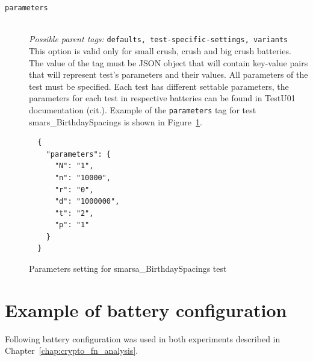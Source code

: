 \documentclass[
  digital,  	%
  color,		%
  oneside,   	%
  12pt,
  nocover,
  notable,
  nolof,
  nolot,
]{fithesis3}
\theoremstyle{definition}
\theoremstyle{remark}
\begin{document}
\begin{description}
\item[\texttt{parameters}] \hfill \\
\textit{Possible parent tags: } \texttt{defaults, test-specific-settings, variants} \\
This option is valid only for small crush, crush and big crush batteries. The value of the tag must be JSON object that will contain key-value pairs that will represent test's parameters and their values. All parameters of the test must be specified. Each test has different settable parameters, the parameters for each test in respective batteries can be found in TestU01 documentation (cit.). Example of the \texttt{parameters} tag for test smars\_BirthdaySpacings is shown in Figure~\ref{fig:params_tag}.

\end{description}

\begin{figure}[H]
\begin{verbatim}
  {
    "parameters": {
      "N": "1",
      "n": "10000",
      "r": "0",
      "d": "1000000",
      "t": "2",
      "p": "1"
    }
  }
\end{verbatim}
\caption{Parameters setting for smarsa\_BirthdaySpacings test}
\label{fig:params_tag}
\end{figure}


\chapter{Example of battery configuration}
\label{app:batt_conf_example}
Following battery configuration was used in both experiments described in Chapter~\ref{chap:crypto_fn_analysis}.
\end{document}

